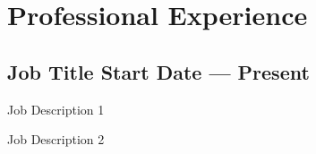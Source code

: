 \section[Professional Experience]{ Professional Experience}

\subsection{Job Title \hfill Start Date --- Present}
\begin{zitemize}
\item Job Description 1
\item Job Description 2
\end{zitemize}


